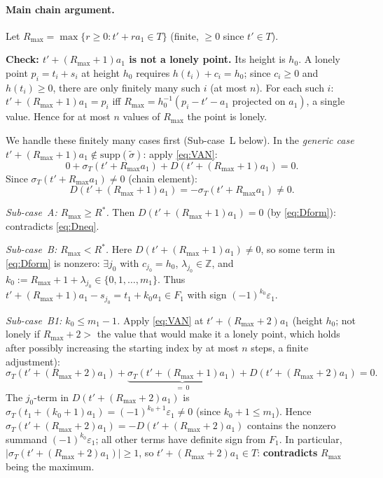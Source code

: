 \paragraph{Main chain argument.}
Let $R_{\max}=\max\{r\ge0:t'+ra_1\in T\}$ (finite, $\ge0$ since $t'\in T$).

\medskip\noindent\textbf{Check: $t'+(R_{\max}+1)a_1$ is not a lonely point.}
Its height is $h_0$.  A lonely point $p_i=t_i+s_i$ at height $h_0$ requires
$h(t_i)+c_i=h_0$; since $c_i\ge0$ and $h(t_i)\ge0$, there are only finitely many
such $i$ (at most $n$).  For each such $i$: $t'+(R_{\max}+1)a_1=p_i$
iff $R_{\max}=h_0^{-1}(p_i-t'-a_1\text{ projected on }a_1)$, a single value.
Hence for at most $n$ values of $R_{\max}$ the point is lonely.

We handle these finitely many cases first (Sub-case~L below).
In the \emph{generic case} $t'+(R_{\max}+1)a_1\notin\mathrm{supp}(\tilde\sigma)$:
apply \eqref{eq:VAN}:
\begin{equation}\label{eq:vanchain}
  0+\sigma_T(t'+R_{\max}a_1)+D(t'+(R_{\max}+1)a_1)=0.
\end{equation}
Since $\sigma_T(t'+R_{\max}a_1)\ne0$ (chain element):
\begin{equation}\label{eq:Dneq}
  D(t'+(R_{\max}+1)a_1)=-\sigma_T(t'+R_{\max}a_1)\ne0.
\end{equation}

\medskip\noindent\textit{Sub-case~A: $R_{\max}\ge R^*$.}
Then $D(t'+(R_{\max}+1)a_1)=0$ (by \eqref{eq:Dform}): contradicts \eqref{eq:Dneq}.

\medskip\noindent\textit{Sub-case~B: $R_{\max}<R^*$.}
Here $D(t'+(R_{\max}+1)a_1)\ne0$, so some term in \eqref{eq:Dform} is nonzero:
$\exists j_0$ with $c_{j_0}=h_0$, $\lambda_{j_0}\in\mathbb{Z}$, and
$k_0:=R_{\max}+1+\lambda_{j_0}\in\{0,1,\ldots,m_1\}$.
Thus $t'+(R_{\max}+1)a_1-s_{j_0}=t_1+k_0 a_1\in F_1$ with sign $(-1)^{k_0}\varepsilon_1$.

\medskip\noindent\textit{Sub-case~B1: $k_0\le m_1-1$.}
Apply \eqref{eq:VAN} at $t'+(R_{\max}+2)a_1$ (height $h_0$; not lonely
if $R_{\max}+2>$ the value that would make it a lonely point, which holds after
possibly increasing the starting index by at most $n$ steps, a finite adjustment):
\[
  \sigma_T(t'+(R_{\max}+2)a_1)+\underbrace{\sigma_T(t'+(R_{\max}+1)a_1)}_{=\,0}
  +D(t'+(R_{\max}+2)a_1)=0.
\]
The $j_0$-term in $D(t'+(R_{\max}+2)a_1)$ is $\sigma_T(t_1+(k_0+1)a_1)=(-1)^{k_0+1}\varepsilon_1\ne0$
(since $k_0+1\le m_1$).
Hence $\sigma_T(t'+(R_{\max}+2)a_1)=-D(t'+(R_{\max}+2)a_1)$
contains the nonzero summand $(-1)^{k_0}\varepsilon_1$; all other terms have definite sign from $F_1$.
In particular, $|\sigma_T(t'+(R_{\max}+2)a_1)|\ge1$, so $t'+(R_{\max}+2)a_1\in T$:
\textbf{contradicts} $R_{\max}$ being the maximum.

